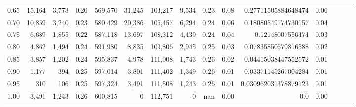 \begin{tabular}{rrrrrrrrrrrrrrr}
0.65 &   15,164 &   3,773 &  0.20 &  569,570 &   31,245 &  103,217 &    9,534 &  0.23 &  0.08 &   0.27711505884648474 &      0.06 \\
0.70 &   10,859 &   3,240 &  0.23 &  580,429 &   20,386 &  106,457 &    6,294 &  0.24 &  0.06 &   0.18080549174730157 &      0.04 \\
0.75 &    6,689 &   1,855 &  0.22 &  587,118 &   13,697 &  108,312 &    4,439 &  0.24 &  0.04 &      0.12148007556474 &      0.03 \\
0.80 &    4,862 &   1,494 &  0.24 &  591,980 &    8,835 &  109,806 &    2,945 &  0.25 &  0.03 &   0.07835850679816588 &      0.02 \\
0.85 &    3,857 &   1,202 &  0.24 &  595,837 &    4,978 &  111,008 &    1,743 &  0.26 &  0.02 &   0.04415038447552572 &      0.01 \\
0.90 &    1,177 &     394 &  0.25 &  597,014 &    3,801 &  111,402 &    1,349 &  0.26 &  0.01 &   0.03371145267004284 &      0.01 \\
0.95 &      310 &     106 &  0.25 &  597,324 &    3,491 &  111,508 &    1,243 &  0.26 &  0.01 &  0.030962031378879123 &      0.01 \\
1.00 &    3,491 &   1,243 &  0.26 &  600,815 &        0 &  112,751 &        0 &   nan &  0.00 &                   0.0 &      0.00 \\
\bottomrule
\end{tabular}
